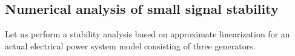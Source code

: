 \documentclass[graybox, envcountchap]{svmult}
\begin{document}
\subsection{Numerical analysis of small signal stability}

Let us perform a stability analysis based on approximate linearization for an
actual electrical power system model consisting of three generators.

%
\end{document}
